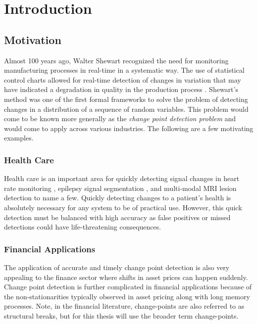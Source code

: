 \chapter{Introduction}
\section{Motivation}
Almost 100 years ago, Walter Shewart recognized the need for monitoring manufacturing processes in real-time in a systematic way. The use of statistical control charts allowed for real-time detection of changes in variation that may have indicated a degradation in quality in the production process \cite{shewhart1931economic} . Shewart's method was one of the first formal frameworks to solve the problem of detecting changes in a distribution of a sequence of random variables. This problem would come to be known more generally as the \textit{change point detection problem} and would come to apply across various industries. The following are a few motivating examples.

\subsection{Health Care}
Health care is an important area for quickly detecting signal changes in heart rate monitoring \cite{yang2006adaptive} \cite{staudacher2005new}, epilepsy signal segmentation \cite{malladi2013online}, and multi-modal MRI lesion detection \cite{bosc2003automatic} to name a few. Quickly detecting changes to a patient's health is absolutely necessary for any system to be of practical use. However, this quick detection must be balanced with high accuracy as false positives or missed detections could have life-threatening consequences.


\subsection{Financial Applications}
The application of accurate and timely change point detection is also very appealing to the finance sector where shifts in asset prices can happen suddenly. Change point detection is further complicated in financial applications because of the non-stationarities typically observed in asset pricing along with long memory processes. Note, in the financial literature, change-points  are also referred to as structural breaks, but for this thesis will use the broader term change-points.

